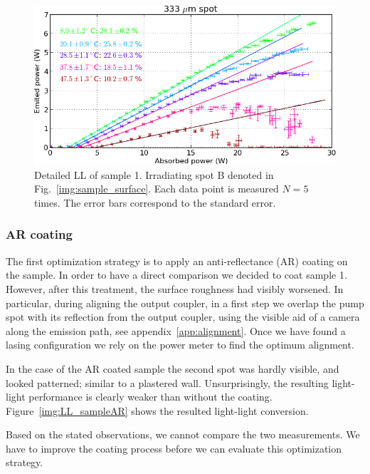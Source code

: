 \begin{figure}
\centering
\includegraphics[width=14.5cm]{img/LL_sample.png}
\caption{Detailed LL of sample 1.
Irradiating spot B denoted in
Fig.~\ref{img:sample_surface}.
Each data point is measured $N=5$ times.
The error bars correspond
to the standard error.}
\label{img:LL_sample}
\end{figure}


\subsubsection{AR coating}
\label{sec:eval:maxout:AR}

The first optimization strategy
\cite{Hader2011}
is to apply
an anti-reflectance (AR) coating
on the sample.
In order to have
a direct comparison
we decided
to coat sample 1. 
However,
after this treatment,
the surface roughness
had visibly worsened.
In particular,
during aligning the output coupler,
in a first step we overlap
the pump spot with its reflection
from the output coupler,
using the visible aid
of a camera
along the emission path,
see appendix~\ref{app:alignment}.
Once we have found a lasing configuration
we rely on the power meter
to find the optimum alignment.

In the case of
the AR coated sample
the second spot
was hardly visible,
and looked patterned;
similar to a plastered wall.
Unsurprisingly,
the resulting light-light performance
is clearly weaker
than without the coating.
Figure~\ref{img:LL_sampleAR}
shows the resulted
light-light conversion.

Based on the stated observations,
we cannot compare
the two measurements.
We have to improve the coating process
before we can evaluate this optimization strategy.

